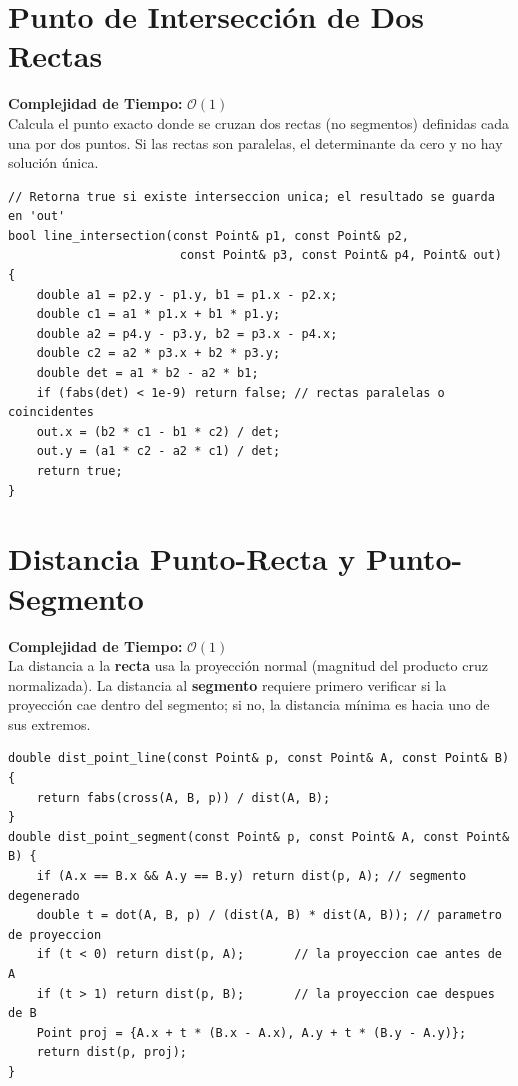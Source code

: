 \documentclass[10pt,twocolumn,letterpaper]{report}
\begin{document}
\section{Punto de Intersección de Dos Rectas}
\textbf{Complejidad de Tiempo:} $\mathcal{O}(1)$ \\
Calcula el punto exacto donde se cruzan dos rectas (no segmentos) definidas cada una por dos puntos. Si las rectas son paralelas, el determinante da cero y no hay solución única.
\begin{lstlisting}
// Retorna true si existe interseccion unica; el resultado se guarda en 'out'
bool line_intersection(const Point& p1, const Point& p2,
                        const Point& p3, const Point& p4, Point& out) {
    double a1 = p2.y - p1.y, b1 = p1.x - p2.x;
    double c1 = a1 * p1.x + b1 * p1.y;
    double a2 = p4.y - p3.y, b2 = p3.x - p4.x;
    double c2 = a2 * p3.x + b2 * p3.y;
    double det = a1 * b2 - a2 * b1;
    if (fabs(det) < 1e-9) return false; // rectas paralelas o coincidentes
    out.x = (b2 * c1 - b1 * c2) / det;
    out.y = (a1 * c2 - a2 * c1) / det;
    return true;
}
\end{lstlisting}
\section{Distancia Punto-Recta y Punto-Segmento}
\textbf{Complejidad de Tiempo:} $\mathcal{O}(1)$ \\
La distancia a la \textbf{recta} usa la proyección normal (magnitud del producto cruz normalizada). La distancia al \textbf{segmento} requiere primero verificar si la proyección cae dentro del segmento; si no, la distancia mínima es hacia uno de sus extremos.
\begin{lstlisting}
double dist_point_line(const Point& p, const Point& A, const Point& B) {
    return fabs(cross(A, B, p)) / dist(A, B);
}
double dist_point_segment(const Point& p, const Point& A, const Point& B) {
    if (A.x == B.x && A.y == B.y) return dist(p, A); // segmento degenerado
    double t = dot(A, B, p) / (dist(A, B) * dist(A, B)); // parametro de proyeccion
    if (t < 0) return dist(p, A);       // la proyeccion cae antes de A
    if (t > 1) return dist(p, B);       // la proyeccion cae despues de B
    Point proj = {A.x + t * (B.x - A.x), A.y + t * (B.y - A.y)};
    return dist(p, proj);
}
\end{lstlisting}
\end{document}

